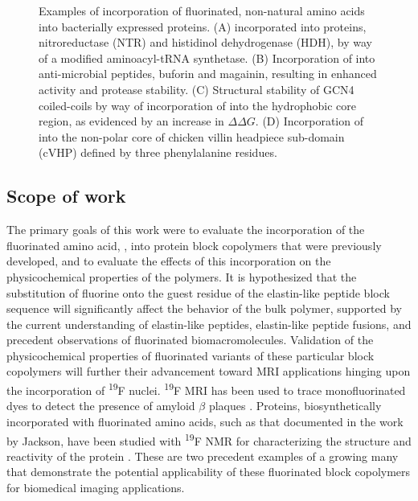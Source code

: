 \begin{refsection}
\begin{figure}[h!]
        {Examples of incorporation of fluorinated, non-natural amino acids
        into bacterially expressed proteins.
        (A)
         incorporated into
         proteins, nitroreductase (NTR) and histidinol
        dehydrogenase (HDH), by way of a modified aminoacyl-tRNA
        synthetase.\cite{Jackson2007}
        (B)
        Incorporation of  into anti-microbial
        peptides, buforin and magainin, resulting in enhanced activity and
        protease stability.\cite{Meng2007}
        (C) Structural stability of GCN4 coiled-coils by way
        of incorporation of  into the hydrophobic
        core region, as evidenced by an increase in ${\Delta\Delta
        G}$.\cite{Lee2004}
        (D)
        Incorporation of  into the non-polar
        core of chicken villin headpiece sub-domain (cVHP) defined by three
        phenylalanine residues.\cite{Woll2006}}
        \label{fig:fluorination_examples}
    \end{figure}

\subsection{Scope of work}

The primary goals of this work were to evaluate the incorporation of
the fluorinated amino acid, , into protein block
copolymers that were previously developed, and to evaluate the effects of this
incorporation on the physicochemical properties of the polymers.
It is hypothesized that the substitution of fluorine onto the guest residue of
the elastin-like peptide block sequence will significantly affect the behavior
of the bulk polymer, supported by the current understanding of elastin-like
peptides, elastin-like peptide fusions, and precedent observations of
fluorinated biomacromolecules. Validation of the physicochemical properties of
fluorinated variants of these particular block copolymers will further their
advancement toward MRI applications hinging upon the incorporation of
\textsuperscript{19}F nuclei. \textsuperscript{19}F MRI has been used to trace
monofluorinated dyes to detect the presence of amyloid ${\beta}$ plaques
.\cite{Higuchi2005} Proteins, biosynthetically
incorporated with fluorinated amino acids, such as that documented in the work
by Jackson,\cite{Jackson2007} have been studied with \textsuperscript{19}F NMR for
characterizing the structure and reactivity of the protein .
These are two precedent examples of a growing many that demonstrate the
potential applicability of these fluorinated block copolymers for biomedical
imaging applications.


\end{refsection}

